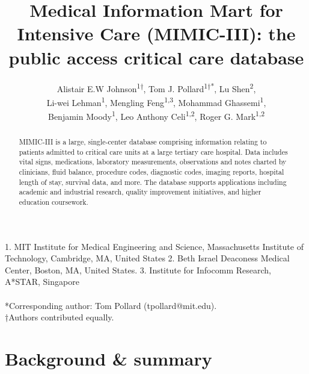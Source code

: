 \documentclass[english]{article}
\begin{document}
\title{Medical Information Mart for Intensive Care (MIMIC-III): the public access critical care database}

\author{
Alistair E.W Johnson\textsuperscript{1{†}},
Tom J. Pollard\textsuperscript{1{†}{*}},
Lu Shen\textsuperscript{2}, \\
Li-wei Lehman\textsuperscript{1},
Mengling Feng\textsuperscript{1,3},
Mohammad Ghassemi\textsuperscript{1}, \\
Benjamin Moody\textsuperscript{1},
Leo Anthony Celi\textsuperscript{1,2},
Roger G. Mark\textsuperscript{1,2}
}

\maketitle
\thispagestyle{fancy}

1. MIT Institute for Medical Engineering and Science, Massachusetts Institute of Technology, Cambridge, MA, United States 2. Beth Israel Deaconess Medical Center, Boston, MA, United States. 3. Institute for Infocomm Research, A*STAR, Singapore \\ 
\\
{*}Corresponding author: Tom Pollard (tpollard@mit.edu). \\
{†}Authors contributed equally.

\begin{abstract} %
MIMIC-III is a large, single-center database comprising information relating to patients admitted to critical care units at a large tertiary care hospital. Data includes vital signs, medications, laboratory measurements, observations and notes charted by clinicians, fluid balance, procedure codes, diagnostic codes, imaging reports, hospital length of stay, survival data, and more. The database supports applications including academic and industrial research, quality improvement initiatives, and higher education coursework.
\end{abstract}

\section*{Background \& summary} %
\end{document}
